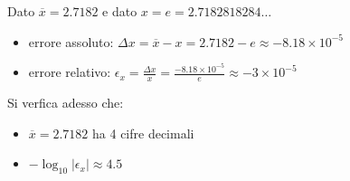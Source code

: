 Dato \(\overline{x} = 2.7182\) e dato \(x = e = 2.7182818284\ldots \)

\begin{itemize}

\item errore assoluto: \(\Delta x = \overline{x} - x = 2.7182 - e \approx - 8.18 \times 10^{-5}\)
\item errore relativo: \(\epsilon_x = \frac{\Delta x}{x} = \frac{- 8.18 \times 10^{-5}}{e} \approx - 3 \times 10^{-5}\)

\end{itemize}

\noindent Si verfica adesso che:

\begin{itemize}
\item \(\overline{x} = 2.7182\) ha 4 cifre decimali
\item \(- \log_{10}|\epsilon_x| \approx 4.5 \)
\end{itemize}
